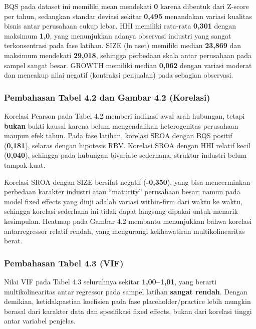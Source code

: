 \documentclass[12pt,a4paper]{report}
\begin{document}
BQS pada dataset ini memiliki mean mendekati \textbf{0} karena dibentuk
dari Z-score per tahun, sedangkan standar deviasi sekitar \textbf{0,495}
menandakan variasi kualitas bisnis antar perusahaan cukup lebar. HHI
memiliki rata-rata \textbf{0,301} dengan maksimum \textbf{1,0}, yang
menunjukkan adanya observasi industri yang sangat terkonsentrasi pada
fase latihan. SIZE (ln aset) memiliki median \textbf{23,869} dan
maksimum mendekati \textbf{29,018}, sehingga perbedaan skala antar
perusahaan pada sampel sangat besar. GROWTH memiliki median
\textbf{0,062} dengan variasi moderat dan mencakup nilai negatif
(kontraksi penjualan) pada sebagian observasi.

\hypertarget{pembahasan-tabel-4.2-dan-gambar-4.2-korelasi}{%
\subsubsection{Pembahasan Tabel 4.2 dan Gambar 4.2
(Korelasi)}\label{pembahasan-tabel-4.2-dan-gambar-4.2-korelasi}}

Korelasi Pearson pada Tabel 4.2 memberi indikasi awal arah hubungan,
tetapi \textbf{bukan} bukti kausal karena belum mengendalikan
heterogenitas perusahaan maupun efek tahun. Pada fase latihan, korelasi
SROA dengan BQS positif (\textbf{0,181}), selaras dengan hipotesis RBV.
Korelasi SROA dengan HHI relatif kecil (\textbf{0,040}), sehingga pada
hubungan bivariate sederhana, struktur industri belum tampak kuat.

Korelasi SROA dengan SIZE bersifat negatif (\textbf{-0,350}), yang bisa
mencerminkan perbedaan karakter industri atau ``maturity'' perusahaan
besar; namun pada model fixed effects yang diuji adalah variasi
within-firm dari waktu ke waktu, sehingga korelasi sederhana ini tidak
dapat langsung dipakai untuk menarik kesimpulan. Heatmap pada Gambar 4.2
membantu menunjukkan bahwa korelasi antarregressor relatif rendah, yang
mengurangi kekhawatiran multikolinearitas berat.

\hypertarget{pembahasan-tabel-4.3-vif}{%
\subsubsection{Pembahasan Tabel 4.3
(VIF)}\label{pembahasan-tabel-4.3-vif}}

Nilai VIF pada Tabel 4.3 seluruhnya sekitar \textbf{1,00--1,01}, yang
berarti multikolinearitas antar regressor pada sampel latihan
\textbf{sangat rendah}. Dengan demikian, ketidakpastian koefisien pada
fase placeholder/practice lebih mungkin berasal dari karakter data dan
spesifikasi fixed effects, bukan dari korelasi tinggi antar variabel
penjelas.
\end{document}
